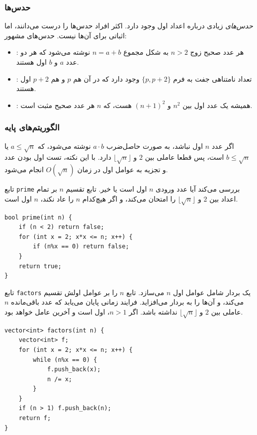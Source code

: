 \subsubsection{حدس‌ها}

\emph{حدس‌های} زیادی درباره اعداد اول وجود دارد.
اکثر افراد حدس‌ها را درست می‌دانند،
اما اثباتی برای آن‌ها نیست.
حدس‌های مشهور:

\begin{itemize}
\item {}:
هر عدد صحیح زوج $n>2$ به شکل
مجموع $n=a+b$ نوشته می‌شود که هر دو عدد $a$ و $b$ اول هستند.
\item {}:
تعداد نامتناهی جفت
به فرم $\{p,p+2\}$ وجود دارد
که در آن هم $p$ و هم $p+2$ اول هستند.
\item {}:
همیشه یک عدد اول بین
$n^2$ و $(n+1)^2$ هست، که $n$ هر عدد صحیح مثبت است.
\end{itemize}

\subsubsection{الگوریتم‌های پایه}

اگر عدد $n$ اول نباشد،
به صورت حاصل‌ضرب $a \cdot b$ نوشته می‌شود،
که $a \le \sqrt n$ یا $b \le \sqrt n$ است،
پس قطعا عاملی بین $2$ و $\lfloor \sqrt n \rfloor$ دارد.
با این نکته، تست اول بودن عدد
و تجزیه به عوامل اول در زمان $O(\sqrt n)$ انجام می‌شود.

تابع \texttt{prime} بررسی می‌کند
آیا عدد ورودی $n$ اول است یا خیر.
تابع تقسیم $n$ بر
تمام اعداد بین $2$ و $\lfloor \sqrt n \rfloor$ را امتحان می‌کند،
و اگر هیچ‌کدام $n$ را عاد نکند، $n$ اول است.

\begin{lstlisting}
bool prime(int n) {
    if (n < 2) return false;
    for (int x = 2; x*x <= n; x++) {
        if (n%x == 0) return false;
    }
    return true;
}
\end{lstlisting}

\noindent
تابع \texttt{factors}
یک بردار شامل عوامل اول $n$
می‌سازد.
تابع $n$ را بر عوامل اولش تقسیم می‌کند،
و آن‌ها را به بردار می‌افزاید.
فرایند زمانی پایان می‌یابد که عدد باقی‌مانده $n$
عاملی بین $2$ و $\lfloor \sqrt n \rfloor$ نداشته باشد.
اگر $n>1$، اول است و آخرین عامل خواهد بود.

\begin{lstlisting}
vector<int> factors(int n) {
    vector<int> f;
    for (int x = 2; x*x <= n; x++) {
        while (n%x == 0) {
            f.push_back(x);
            n /= x;
        }
    }
    if (n > 1) f.push_back(n);
    return f;
}
\end{lstlisting}

